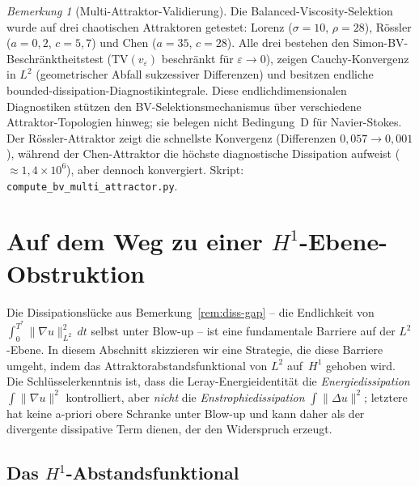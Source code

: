 \documentclass[12pt,a4paper]{article}
\theoremstyle{definition}
\theoremstyle{plain}
\theoremstyle{remark}
\newtheorem{remark}[definition]{Bemerkung}
\begin{document}
\begin{remark}[Multi-Attraktor-Validierung]
\label{rem:multi-attractor}
Die Balanced-Viscosity-Selektion wurde auf drei chaotischen Attraktoren getestet: Lorenz ($\sigma=10$, $\rho=28$), R\"ossler ($a=0{,}2$, $c=5{,}7$) und Chen ($a=35$, $c=28$). Alle drei bestehen den Simon-BV-Beschränktheitstest ($\mathrm{TV}(v_\varepsilon)$ beschränkt für $\varepsilon \to 0$), zeigen Cauchy-Konvergenz in $L^2$ (geometrischer Abfall sukzessiver Differenzen) und besitzen endliche bounded-dissipation-Diagnostikintegrale. Diese endlichdimensionalen Diagnostiken stützen den BV-Selektionsmechanismus über verschiedene Attraktor-Topologien hinweg; sie belegen nicht Bedingung~D für Navier-Stokes. Der R\"ossler-Attraktor zeigt die schnellste Konvergenz (Differenzen $0{,}057 \to 0{,}001$), während der Chen-Attraktor die höchste diagnostische Dissipation aufweist ($\approx 1{,}4 \times 10^6$), aber dennoch konvergiert. Skript: \texttt{compute\_bv\_multi\_attractor.py}.
\end{remark}

\section{Auf dem Weg zu einer \texorpdfstring{$H^1$}{H1}-Ebene-Obstruktion}\label{sec:H1-lift}

Die Dissipationslücke aus Bemerkung~\ref{rem:diss-gap} -- die
Endlichkeit von $\int_0^{T^*}\|\nabla u\|_{L^2}^2\,dt$ selbst unter
Blow-up -- ist eine fundamentale Barriere auf der $L^2$-Ebene. In diesem
Abschnitt skizzieren wir eine Strategie, die diese Barriere umgeht, indem
das Attraktorabstandsfunktional von $L^2$ auf~$H^1$ gehoben wird.
Die Schlüsselerkenntnis ist, dass die Leray-Energieidentität die
\emph{Energiedissipation} $\int\|\nabla u\|^2$ kontrolliert, aber \emph{nicht} die
\emph{Enstrophiedissipation} $\int\|\Delta u\|^2$; letztere hat
keine a-priori obere Schranke unter Blow-up und kann daher als der
divergente dissipative Term dienen, der den Widerspruch erzeugt.

\subsection{Das \texorpdfstring{$H^1$}{H1}-Abstandsfunktional}
\end{document}
